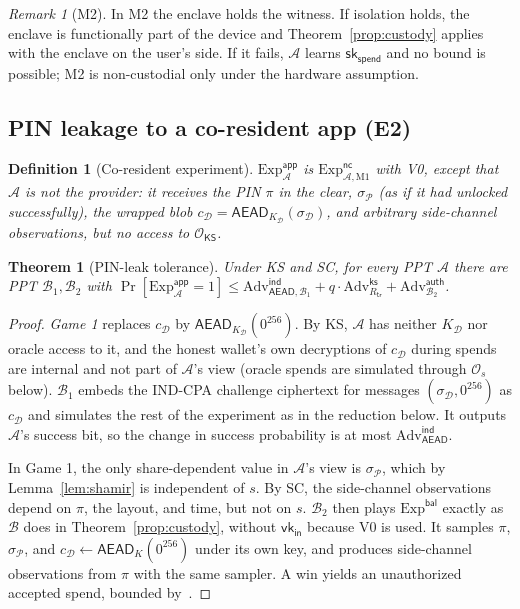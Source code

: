 \documentclass[11pt]{article}
\newtheorem{theorem}{Theorem}
\newtheorem{definition}{Definition}
\theoremstyle{remark}
\newtheorem{remark}{Remark}
\newcommand{\sk}{\mathsf{sk}}
\newcommand{\vk}{\mathsf{vk}}
\begin{document}
\begin{remark}[M2]
In M2 the enclave holds the witness. If isolation holds, the enclave is functionally part of the device and Theorem~\ref{prop:custody} applies with the enclave on the user's side. If it fails, $\mathcal{A}$ learns $\sk_{\mathsf{spend}}$ and no bound is possible; M2 is non-custodial only under the hardware assumption.
\end{remark}

\subsection{PIN leakage to a co-resident app (E2)}

\begin{definition}[Co-resident experiment]
$\mathrm{Exp}^{\mathsf{app}}_{\mathcal{A}}$ is $\mathrm{Exp}^{\mathsf{nc}}_{\mathcal{A},\mathrm{M1}}$ with V0, except that $\mathcal{A}$ is not the provider: it receives the PIN $\pi$ in the clear, $\sigma_{\mathcal{P}}$ (as if it had unlocked successfully), the wrapped blob $c_{\mathcal{D}} = \mathsf{AEAD}_{K_{\mathcal{D}}}(\sigma_{\mathcal{D}})$, and arbitrary side-channel observations, but no access to $\mathcal{O}_{\mathsf{KS}}$.
\end{definition}

\begin{theorem}[PIN-leak tolerance]
\label{thm:app}
Under KS and SC, for every PPT $\mathcal{A}$ there are PPT $\mathcal{B}_1, \mathcal{B}_2$ with
$\Pr[\mathrm{Exp}^{\mathsf{app}}_{\mathcal{A}} = 1] \le \mathrm{Adv}^{\mathsf{ind}}_{\mathsf{AEAD},\mathcal{B}_1} + q\cdot\mathrm{Adv}^{\mathsf{ks}}_{R_{\mathsf{tr}}} + \mathrm{Adv}^{\mathsf{auth}}_{\mathcal{B}_2}$.
\end{theorem}
\begin{proof}
\emph{Game 1} replaces $c_{\mathcal{D}}$ by $\mathsf{AEAD}_{K_{\mathcal{D}}}(0^{256})$. By KS, $\mathcal{A}$ has neither $K_{\mathcal{D}}$ nor oracle access to it, and the honest wallet's own decryptions of $c_{\mathcal{D}}$ during spends are internal and not part of $\mathcal{A}$'s view (oracle spends are simulated through $\mathcal{O}_s$ below). $\mathcal{B}_1$ embeds the IND-CPA challenge ciphertext for messages $(\sigma_{\mathcal{D}}, 0^{256})$ as $c_{\mathcal{D}}$ and simulates the rest of the experiment as in the reduction below. It outputs $\mathcal{A}$'s success bit, so the change in success probability is at most $\mathrm{Adv}^{\mathsf{ind}}_{\mathsf{AEAD}}$.

In Game 1, the only share-dependent value in $\mathcal{A}$'s view is $\sigma_{\mathcal{P}}$, which by Lemma~\ref{lem:shamir} is independent of $s$. By SC, the side-channel observations depend on $\pi$, the layout, and time, but not on $s$. $\mathcal{B}_2$ then plays $\mathrm{Exp}^{\mathsf{bal}}$ exactly as $\mathcal{B}$ does in Theorem~\ref{prop:custody}, without $\vk_{\mathsf{in}}$ because V0 is used. It samples $\pi$, $\sigma_{\mathcal{P}}$, and $c_{\mathcal{D}} \leftarrow \mathsf{AEAD}_{K}(0^{256})$ under its own key, and produces side-channel observations from $\pi$ with the same sampler. A win yields an unauthorized accepted spend, bounded by~\cite[Cor.~2]{sb26}.
\end{proof}
\end{document}
